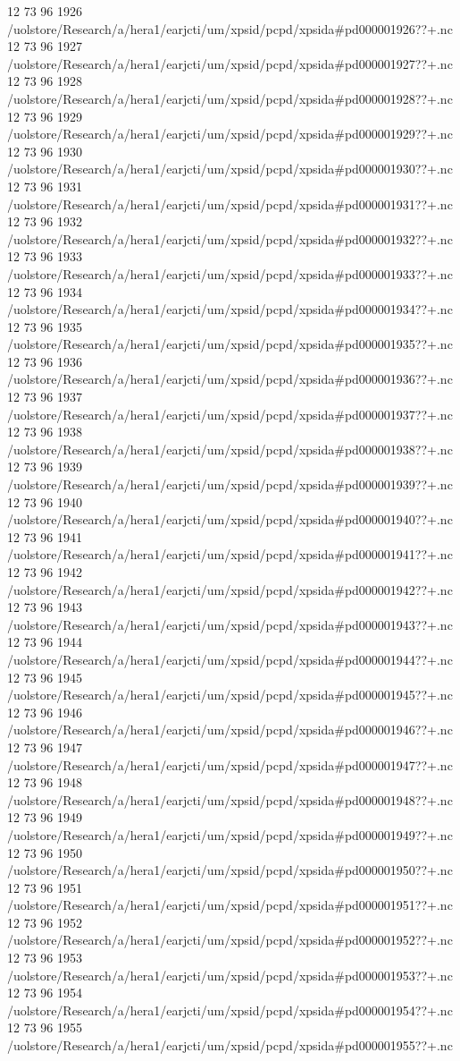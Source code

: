 12 73 96
1926
/uolstore/Research/a/hera1/earjcti/um/xpsid/pcpd/xpsida#pd000001926??+.nc
12 73 96
1927
/uolstore/Research/a/hera1/earjcti/um/xpsid/pcpd/xpsida#pd000001927??+.nc
12 73 96
1928
/uolstore/Research/a/hera1/earjcti/um/xpsid/pcpd/xpsida#pd000001928??+.nc
12 73 96
1929
/uolstore/Research/a/hera1/earjcti/um/xpsid/pcpd/xpsida#pd000001929??+.nc
12 73 96
1930
/uolstore/Research/a/hera1/earjcti/um/xpsid/pcpd/xpsida#pd000001930??+.nc
12 73 96
1931
/uolstore/Research/a/hera1/earjcti/um/xpsid/pcpd/xpsida#pd000001931??+.nc
12 73 96
1932
/uolstore/Research/a/hera1/earjcti/um/xpsid/pcpd/xpsida#pd000001932??+.nc
12 73 96
1933
/uolstore/Research/a/hera1/earjcti/um/xpsid/pcpd/xpsida#pd000001933??+.nc
12 73 96
1934
/uolstore/Research/a/hera1/earjcti/um/xpsid/pcpd/xpsida#pd000001934??+.nc
12 73 96
1935
/uolstore/Research/a/hera1/earjcti/um/xpsid/pcpd/xpsida#pd000001935??+.nc
12 73 96
1936
/uolstore/Research/a/hera1/earjcti/um/xpsid/pcpd/xpsida#pd000001936??+.nc
12 73 96
1937
/uolstore/Research/a/hera1/earjcti/um/xpsid/pcpd/xpsida#pd000001937??+.nc
12 73 96
1938
/uolstore/Research/a/hera1/earjcti/um/xpsid/pcpd/xpsida#pd000001938??+.nc
12 73 96
1939
/uolstore/Research/a/hera1/earjcti/um/xpsid/pcpd/xpsida#pd000001939??+.nc
12 73 96
1940
/uolstore/Research/a/hera1/earjcti/um/xpsid/pcpd/xpsida#pd000001940??+.nc
12 73 96
1941
/uolstore/Research/a/hera1/earjcti/um/xpsid/pcpd/xpsida#pd000001941??+.nc
12 73 96
1942
/uolstore/Research/a/hera1/earjcti/um/xpsid/pcpd/xpsida#pd000001942??+.nc
12 73 96
1943
/uolstore/Research/a/hera1/earjcti/um/xpsid/pcpd/xpsida#pd000001943??+.nc
12 73 96
1944
/uolstore/Research/a/hera1/earjcti/um/xpsid/pcpd/xpsida#pd000001944??+.nc
12 73 96
1945
/uolstore/Research/a/hera1/earjcti/um/xpsid/pcpd/xpsida#pd000001945??+.nc
12 73 96
1946
/uolstore/Research/a/hera1/earjcti/um/xpsid/pcpd/xpsida#pd000001946??+.nc
12 73 96
1947
/uolstore/Research/a/hera1/earjcti/um/xpsid/pcpd/xpsida#pd000001947??+.nc
12 73 96
1948
/uolstore/Research/a/hera1/earjcti/um/xpsid/pcpd/xpsida#pd000001948??+.nc
12 73 96
1949
/uolstore/Research/a/hera1/earjcti/um/xpsid/pcpd/xpsida#pd000001949??+.nc
12 73 96
1950
/uolstore/Research/a/hera1/earjcti/um/xpsid/pcpd/xpsida#pd000001950??+.nc
12 73 96
1951
/uolstore/Research/a/hera1/earjcti/um/xpsid/pcpd/xpsida#pd000001951??+.nc
12 73 96
1952
/uolstore/Research/a/hera1/earjcti/um/xpsid/pcpd/xpsida#pd000001952??+.nc
12 73 96
1953
/uolstore/Research/a/hera1/earjcti/um/xpsid/pcpd/xpsida#pd000001953??+.nc
12 73 96
1954
/uolstore/Research/a/hera1/earjcti/um/xpsid/pcpd/xpsida#pd000001954??+.nc
12 73 96
1955
/uolstore/Research/a/hera1/earjcti/um/xpsid/pcpd/xpsida#pd000001955??+.nc
